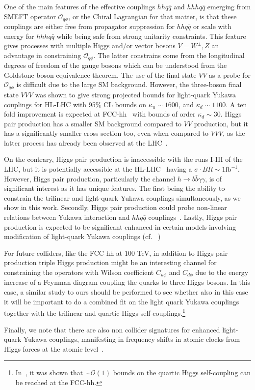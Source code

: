 One of the main features of the effective couplings $hh q\bar q$ and $hhh q\bar q$ emerging from SMEFT operator $\mathcal O_{q\phi}$, or the Chiral Lagrangian for that matter, is that these couplings are either free from propagator suppression for $hh q\bar q$ or scale with energy for $hhh q\bar q$ while being safe from strong unitarity constraints. This feature gives processes with multiple Higgs and/or vector bosons $V= W^\pm, Z$ an advantage in constraining $\mathcal O_{q\phi}$. The latter constrains come from the longitudinal degrees of freedom of the gauge bosons  which can be understood from the Goldstone boson equivalence theorem. The use of the final state $VV$ as a probe for $\mathcal O_{q\phi}$ is difficult due to the large SM background. However, the three-boson final state $VVV$ was shown to give strong projected bounds for light-quark Yukawa couplings for HL-LHC with 95\% CL bounds on $\kappa_u \sim 1600$, and $\kappa_d\sim 1100$. A ten fold improvement is expected at FCC-hh~\cite{Falkowski:2020znk} with bounds of order $\kappa_d\sim 30$. 
Higgs pair production has a smaller SM background compared to $VV$ production, but it has a significantly smaller cross section too, even when compared to $VVV$, as the latter process has already been observed at the LHC~\cite{Sciandra:2688061,CMS-PAS-SMP-19-014}.

On the contrary, Higgs pair production is inaccessible with the runs I-III of the LHC, but it is potentially accessible at the HL-LHC~\cite{Binoth:2006ym} having a $ \sigma \cdot BR\sim 1\mathrm{fb}^{-1}$. However, Higgs pair production, particularly the channel $h \to b \bar b \gamma \gamma $, is of significant interest as it has unique features. The first being the ability to constrain the trilinear and light-quark Yukawa couplings simultaneously, as we show in this work. Secondly, Higgs pair production could probe non-linear relations between Yukawa interaction and $hh q\bar q$ couplings~\cite{Contino:2012xk,Alasfar:2019pmn}. Lastly, Higgs pair production is expected to be significant enhanced in certain models involving modification of light-quark Yukawa couplings (cf. ~\cite{Bar-Shalom:2018rjs,Bauer:2017cov,Egana-Ugrinovic:2021uew})

For future colliders, like the FCC-hh at $100$ TeV, in addition to Higgs pair production triple Higgs production might be an interesting channel for constraining the operators with Wilson coefficient $C_{u\phi}$ and $C_{d\phi}$ due to the energy increase of a Feynman diagram coupling the quarks to three Higgs bosons.   In this case, a similar study to ours should be performed to see whether also in this case it will be important to do a combined fit on the light quark Yukawa couplings together with the trilinear and quartic Higgs self-couplings.\footnote{In~\cite{Papaefstathiou:2047255}, it was shown that $\sim \mathcal{O}(1)$ bounds on the quartic Higgs self-coupling can be reached at the FCC-hh.}

Finally, we note that there are also non collider signatures for enhanced light-quark Yukawa couplings, manifesting in frequency shifts in atomic clocks from Higgs forces at the atomic level~\cite{Delaunay:2016brc}. 